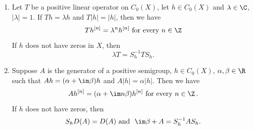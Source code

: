 \begin{theorem}\label{thm:b3-2.4}
\begin{enumerate}	
\item
Let $T$ be a positive linear operator on $C_{0}(X)$, let $h \in C_{0}(X)$ and $\lambda \in \C$, $|\lambda| = 1$.
	If\/ $Th = \lambda h$ and $T|h| = |h|$, then we have 
    \[
    Th^{[n]} = \lambda^{n}h^{[n]} \text{ for every } n \in \Z
    \]
	If\/ $h$ does not have zeros in $X$, then 
	\[
	\lambda T = S_{h}^{-1}TS_{h}.
	\]
\item
Suppose $A$ is the generator of a positive semigroup, $h \in C_{0}(X)$, $\alpha,\beta \in \R$ such that $Ah = (\alpha+\im\beta )h$ and $A|h| = \alpha|h|$. 
	Then we have 
    \[
    Ah^{[n]} = (\alpha+\im n\beta)h^{[n]} \text{ for every } n \in \Z\,.
    \]
	If\/ $h$ does not have zeros, then 
	\[
	S_{h}D(A) = D(A) \text{ and \ } \im\beta + A = S_{h}^{-1}AS_{h}.
	\]
\end{enumerate}
\end{theorem}
